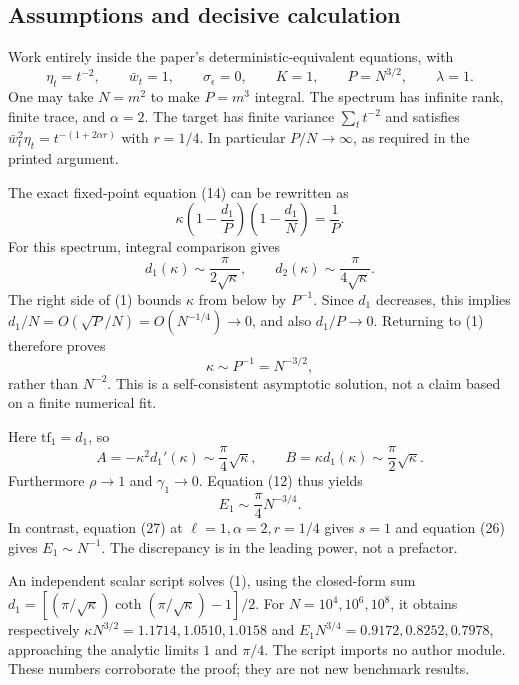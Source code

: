 \documentclass[10pt]{article}
\begin{document}
\subsection*{Assumptions and decisive calculation}
Work entirely inside the paper’s deterministic-equivalent equations, with \[\eta_t=t^{-2},\qquad \bar w_t=1,\qquad
 \sigma_\epsilon=0,\qquad K=1,\qquad
 P=N^{3/2},\qquad \lambda=1.\] One may take \(N=m^2\) to make \(P=m^3\) integral. The spectrum has infinite rank, finite trace, and \(\alpha=2\). The target has finite variance \(\sum_t t^{-2}\) and satisfies \(\bar w_t^2\eta_t=t^{-(1+2\alpha r)}\) with \(r=1/4\). In particular \(P/N\to\infty\), as required in the printed argument.\par
The exact fixed-point equation (14) can be rewritten as \[\kappa\left(1-\frac{d_1}{P}\right)
        \left(1-\frac{d_1}{N}\right)=\frac1P.
 \tag{1}\] For this spectrum, integral comparison gives \[d_1(\kappa)\sim \frac{\pi}{2\sqrt{\kappa}},
 \qquad
 d_2(\kappa)\sim \frac{\pi}{4\sqrt{\kappa}}.
 \tag{2}\] The right side of (1) bounds \(\kappa\) from below by \(P^{-1}\). Since \(d_1\) decreases, this implies \(d_1/N=O(\sqrt P/N)=O(N^{-1/4})\to0\), and also \(d_1/P\to0\). Returning to (1) therefore proves \[\kappa\sim P^{-1}=N^{-3/2},\] rather than \(N^{-2}\). This is a self-consistent asymptotic solution, not a claim based on a finite numerical fit.\par
Here \(\mathrm{tf}_1=d_1\), so \[A=-\kappa^2d_1'(\kappa)\sim\frac{\pi}{4}\sqrt{\kappa},
 \qquad
 B=\kappa d_1(\kappa)\sim\frac{\pi}{2}\sqrt{\kappa}.\] Furthermore \(\rho\to1\) and \(\gamma_1\to0\). Equation (12) thus yields \[E_1\sim \frac{\pi}{4}N^{-3/4}.
 \tag{3}\] In contrast, equation (27) at \(\ell=1,\alpha=2,r=1/4\) gives \(s=1\) and equation (26) gives \(E_1\sim N^{-1}\). The discrepancy is in the leading power, not a prefactor.\par
An independent scalar script solves (1), using the closed-form sum \(d_1=[(\pi/\sqrt\kappa)\coth(\pi/\sqrt\kappa)-1]/2\). For \(N=10^4,10^6,10^8\), it obtains respectively \(\kappa N^{3/2}=1.1714,1.0510,1.0158\) and \(E_1N^{3/4}=0.9172,0.8252,0.7978\), approaching the analytic limits \(1\) and \(\pi/4\). The script imports no author module. These numbers corroborate the proof; they are not new benchmark results.\par
\end{document}
